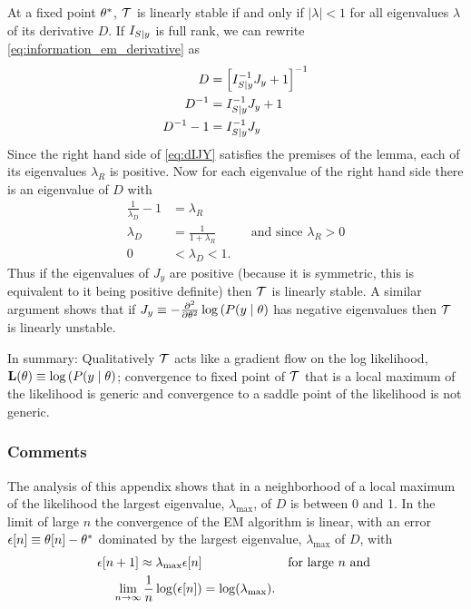 At a fixed point ${\theta^*}$, $\EMmap$ is linearly stable if and
only if $\left| \lambda \right| < 1$ for all eigenvalues $\lambda$ of
its derivative $D$.  If $I_{S \mid y}$ is full rank, we can rewrite
\eqref{eq:information_em_derivative} as
\begin{align}
  \nonumber
  D &= \left[I_{S \mid y}^{-1} J_y + 1 \right]^{-1} \\
  \nonumber
  D^{-1} &= I_{S \mid y}^{-1} J_y + 1 \\
  \label{eq:dIJY}
  D^{-1} -1  &= I_{S \mid y}^{-1} J_y
\end{align}
Since the right hand side of \eqref{eq:dIJY} satisfies the premises of
the lemma, each of its eigenvalues $\lambda_R$ is positive.  Now for
each eigenvalue of the right hand side there is an eigenvalue of $D$
with
\begin{align}
  \nonumber
  \frac{1}{\lambda_D} - 1 &= \lambda_R  \\
  \nonumber
  \lambda_D &= \frac{1}{1+\lambda_R} &&\text{and since } \lambda_R >0 \\
  \label{eq:D_is_stable}
  0 &< \lambda_D < 1.
\end{align}
Thus if the eigenvalues of $J_y$ are positive (because it is
symmetric, this is equivalent to it being positive definite) then
$\EMmap$ is linearly stable.  A similar argument shows that if
$J_y\equiv-\frac{\partial^2}{\partial \theta^2} \log \left( P(y \mid
  \theta \right)$ has negative eigenvalues then $\EMmap$ is linearly
unstable.

In summary: Qualitatively $\EMmap$ acts like a gradient flow on the
log likelihood,
${\bf L}(\theta) \equiv\log \left( P(y \mid \theta
\right)$; convergence to fixed point of $\EMmap$ that is a local
maximum of the likelihood is generic and convergence to a saddle point
of the likelihood is not generic.

\subsubsection{Comments}
\label{sec:ConvergenceRate}

The analysis of this appendix shows that in a neighborhood of a local
maximum of the likelihood the largest eigenvalue,
$\lambda_{\text{max}}$, of $D$ is between 0 and 1.  In the limit of
large $n$ the convergence of the EM algorithm is linear, with an error
${\epsilon}{[n]} \equiv {\theta}{[n]} - {\theta^*}$
dominated by the largest eigenvalue, $\lambda_{\text{max}}$ of $D$,
with
\begin{align*}
  {\epsilon}{[n+1]} \approx \lambda_{\text{max}} {\epsilon}{[n]}
  &&\text{for large } n \text{ and }\\
  \lim_{n \rightarrow \infty} \frac{1}{n}\log({\epsilon}{[n]}) &= \log(\lambda_{\text{max}}).
\end{align*}

